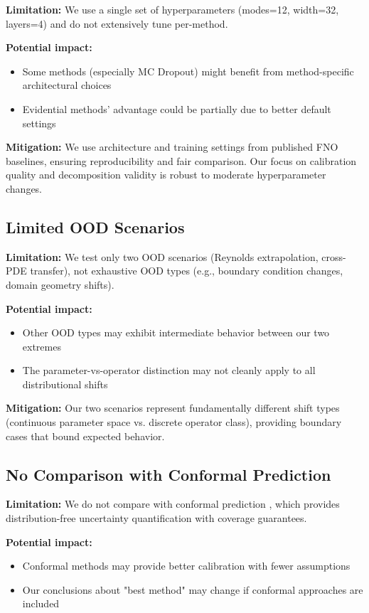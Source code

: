 \textbf{Limitation:} We use a single set of hyperparameters (modes=12, width=32, layers=4) and do not extensively tune per-method.

\textbf{Potential impact:}
\begin{itemize}
\item Some methods (especially MC Dropout) might benefit from method-specific architectural choices
\item Evidential methods' advantage could be partially due to better default settings
\end{itemize}

\textbf{Mitigation:} We use architecture and training settings from published FNO baselines, ensuring reproducibility and fair comparison. Our focus on calibration quality and decomposition validity is robust to moderate hyperparameter changes.

\subsection{Limited OOD Scenarios}

\textbf{Limitation:} We test only two OOD scenarios (Reynolds extrapolation, cross-PDE transfer), not exhaustive OOD types (e.g., boundary condition changes, domain geometry shifts).

\textbf{Potential impact:}
\begin{itemize}
\item Other OOD types may exhibit intermediate behavior between our two extremes
\item The parameter-vs-operator distinction may not cleanly apply to all distributional shifts
\end{itemize}

\textbf{Mitigation:} Our two scenarios represent fundamentally different shift types (continuous parameter space vs. discrete operator class), providing boundary cases that bound expected behavior.

\subsection{No Comparison with Conformal Prediction}

\textbf{Limitation:} We do not compare with conformal prediction \cite{vovk2005algorithmic,shafer2008tutorial}, which provides distribution-free uncertainty quantification with coverage guarantees.

\textbf{Potential impact:}
\begin{itemize}
\item Conformal methods may provide better calibration with fewer assumptions
\item Our conclusions about "best method" may change if conformal approaches are included
\end{itemize}

